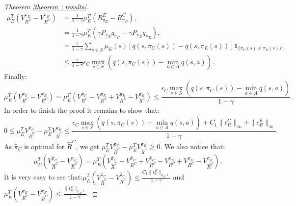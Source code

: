 \documentclass[11pt]{article}
\newcommand{\0}{\mathbf{0}}
\newcommand{\1}{\mathbf{1}}
\begin{document}
\begin{proof}[Theorem \ref{theorem : results}]
\begin{align}
\mu_E^T(V^{\pi_E}_{R^E}-V^{\pi_E}_{R^C})&=\frac{1}{1-\gamma}\mu_E^T(R^E_{\pi_E}-R^C_{\pi_E}),
\\
&=\frac{1}{1-\gamma}\mu_E^T(\gamma P_{\pi_E}q_{\pi_C}-\gamma P_{\pi_E}q_{\pi_E}),
\\
&=\frac{\gamma}{1-\gamma}\sum_{s\in S}\mu_E(s)[q(s,\pi_C(s))-q(s,\pi_E(s))]\mathds{1}_{\{\pi_C(s)\neq\pi_E(s)\}},
\\
&\leq\frac{\gamma}{1-\gamma}\epsilon_C\max_{s\in S}(q(s,\pi_C(s))-\min_{a\in A}q(s,a)).
\end{align}
Finally:
\begin{equation}
\mu_E^T(V^{\pi_C}_{R^C}-V^{\pi_E}_{R^C})=\mu_E^T(V^{\pi_C}_{R^C}-V^{\pi_E}_{R^E}+V^{\pi_E}_{R^E}-V^{\pi_E}_{R^C})\leq\frac{\epsilon_C\max_{s\in S}(q(s,\pi_C(s))-\min_{a\in A}q(s,a))}{1-\gamma}.
\end{equation}
In order to finish the proof it remains to show that:
\begin{equation}
0 \leq \mu_E^TV^{\hat{\pi}_C}_{\hat{R}^C}-\mu_E^TV^{\pi_E}_{\hat{R}^C}\leq \frac{\epsilon_C\max_{s\in S}(q(s,\pi_C(s))-\min_{a\in A}q(s,a))+C_1\|\epsilon^C_R\|_{\infty}+\|\epsilon^E_R\|_{\infty}}{1-\gamma}.
\end{equation}
As $\hat\pi_C$ is optimal for $\hat R^C$, we get $\mu_E^TV^{\hat{\pi}_C}_{\hat{R}^C}-\mu_E^TV^{\pi_E}_{\hat{R}^C}\geq 0$. We also notice that:
\begin{equation}
\mu_E^T(V^{\hat{\pi}_C}_{\hat{R}^C}-V^{\pi_E}_{\hat{R}^C})=\mu_E^T(V^{\hat{\pi}_C}_{\hat{R}^C}-V^{\hat{\pi}_C}_{R^C}+V^{\hat{\pi}_C}_{R^C}-V^{\pi_E}_{R^C}+V^{\pi_E}_{R^C}-V^{\pi_E}_{\hat{R}^C}).
\end{equation}
It is very easy to see that:$\mu_E^T(V^{\hat{\pi}_C}_{\hat{R}^C}-V^{\hat{\pi}_C}_{R^C})\leq\frac{C_1\|\epsilon^E_C\|_{\mu_E,1}}{1-\gamma}$ and $\mu_E^T(V^{\pi_E}_{R^C}-V^{\pi_E}_{\hat{R}^C})\leq\frac{\|\epsilon^E_R\|_{\mu_E,1}}{1-\gamma}$.


\end{proof}
\end{document}
